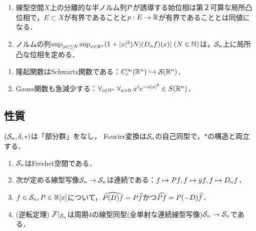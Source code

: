 \documentclass[uplatex,dvipdfmx]{jsreport}
\begin{document}
\begin{lemma}[局所凸位相線形空間である]\mbox{}
    \begin{enumerate}
        \item 線型空間$X$上の分離的な半ノルム列$\P$が誘導する始位相は第２可算な局所凸位相で，$E\subset X$が有界であることと$p:E\to\R$が有界であることとは同値になる．
        \item ノルムの列$\sup_{\abs{\al}\le N}\sup_{x\in\R^n}(1+\abs{x}^2)N\abs{(D_\al f)(x)}\;(N\in\N)$は，$\S_n$上に局所凸な位相を定める．
    \end{enumerate}
\end{lemma}

\begin{example}\mbox{}
    \begin{enumerate}
        \item 隆起関数はSchwartz関数である：$C^\infty_c(\R^n)\mono\cS(\R^n)$．
        \item Gauss関数も急減少する：$\forall_{i\in\N^n}\;\forall_{a>0}\;x^ie^{-a\abs{x}^2}\in S(\R^n)$．
    \end{enumerate}
\end{example}

\subsection{性質}

\begin{tcolorbox}[colframe=ForestGreen, colback=ForestGreen!10!white,breakable,colbacktitle=ForestGreen!40!white,coltitle=black,fonttitle=\bfseries\sffamily,
title=]
    $(\S_n,\delta,*)$は「部分群」をなし，
    Fourier変換は$\S_n$の自己同型で，$*$の構造と両立する．
\end{tcolorbox}

\begin{theorem}\mbox{}
    \begin{enumerate}
        \item $\S_n$はFrechet空間である．
        \item 次が定める線型写像$\S_n\to\S_n$は連続である：$f\mapsto Pf,f\mapsto gf,f\mapsto D_\al f$．
        \item $f\in\S_n,P\in \R[x]$について，$\wh{P(D)f}=P\wh{f}$かつ$\wh{Pf}=P(-D)\wh{f}$．
        \item (逆転定理) $\F|_{\S_n}$は周期$4$の線型同型(全単射な連続線型写像)$\S_n\to\S_n$である．
    \end{enumerate}
\end{theorem}
\end{document}
